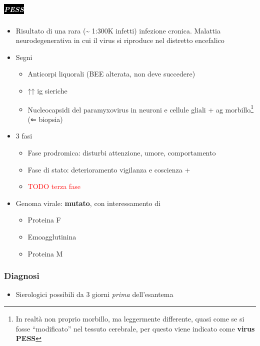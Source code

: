 \documentclass[italian,]{article}
\providecommand{\tightlist}{%
  \setlength{\itemsep}{0pt}\setlength{\parskip}{0pt}}
\newcommand{\pat}[1]{\colorbox{black}{\textcolor{white}{\textsc{#1}}}}
\newcommand{\TODO}[1]{\textcolor{red}{\textsf{\footnotesize{TODO #1}}}} %
\begin{document}
\hypertarget{section-12}{%
\subparagraph{\texorpdfstring{\pat{PESS}}{}}\label{section-12}}

\begin{itemize}
\tightlist
\item
  Risultato di una rara (\textasciitilde{} 1:300K infetti) infezione
  cronica. Malattia neurodegenerativa in cui il virus si riproduce nel
  distretto encefalico
\item
  Segni

  \begin{itemize}
  \tightlist
  \item
    Anticorpi liquorali (BEE alterata, non deve succedere)
  \item
    ↑↑ ig sieriche
  \item
    Nucleocapsidi del paramyxovirus in neuroni e cellule gliali + ag
    morbillo\footnote{In realtà non proprio morbillo, ma leggermente
      differente, quasi come se si fosse ``modificato'' nel tessuto
      cerebrale, per questo viene indicato come \textbf{virus PESS}} (⇐
    biopsia)
  \end{itemize}
\item
  3 fasi

  \begin{itemize}
  \item
    Fase prodromica: disturbi attenzione, umore, comportamento
  \item
    Fase di stato: deterioramento vigilanza e coscienza +
  \item
    \TODO{terza fase}
  \end{itemize}
\item
  Genoma virale: \textbf{mutato}, con interessamento di

  \begin{itemize}
  \tightlist
  \item
    Proteina F
  \item
    Emoagglutinina
  \item
    Proteina M
  \end{itemize}
\end{itemize}

\hypertarget{diagnosi-15}{%
\subsubsection{Diagnosi}\label{diagnosi-15}}

\begin{itemize}
\tightlist
\item
  Sierologici possibili da 3 giorni \emph{prima} dell'esantema
\end{itemize}
\end{document}
